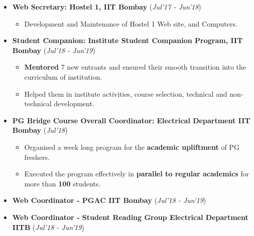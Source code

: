 \documentclass[10pt]{article}
\begin{document}
\begin{itemize}[leftmargin=0.4cm]
\vspace{-0.15cm}
\item \textbf {Web Secretary: Hostel 1, IIT Bombay} 
\hfill{(\textit{Jul'17 - Jun'18})}\\[-0.6cm]
    \begin{itemize}
	\item Development and Maintenance of Hostel 1 Web site, and Computers.
	\end{itemize}
	\vspace{-0.25cm}
	
	
\item \textbf{Student Companion: Institute Student Companion Program, IIT Bombay}
\hfill{(\textit{Jul'18 - Jun'19})}\\[-0.6cm]
    \begin{itemize}
			\item \textbf{Mentored} 7 new entrants and ensured their smooth transition into the curriculum of institution.\vspace{-0.1cm}
            \item Helped them in institute activities, course selection, technical and non-technical development.
		\end{itemize}
		\vspace{-0.25cm}
	
\item \textbf{PG Bridge Course Overall Coordinator: Electrical Department IIT Bombay}
\hfill{(\textit{Jul'18})}\\[-0.6cm]
    \begin{itemize}
            \item Organised a week long program for the \textbf{academic upliftment} of PG freshers.\vspace{-0.1cm}
            \item Executed the program effectively in \textbf{parallel to regular academics} for more than \textbf{100} students.
		\end{itemize}
		\vspace{-0.25cm}	

\item \textbf{Web Coordinator - PGAC IIT Bombay}
\hfill{(\textit{Jul'18 - Jun'19})}\\[-0.6cm]


\item \textbf{Web Coordinator - Student Reading Group Electrical Department IITB} \hfill{(\textit{Jul'18 - Jun'19})}\vspace{-0.2cm}
    	
\end{itemize}
\vspace{0.1cm}
\end{document}

